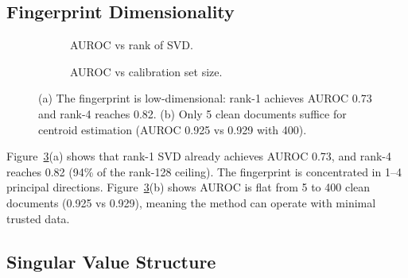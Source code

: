 \documentclass[11pt,a4paper]{article}
\begin{document}
\subsection{Fingerprint Dimensionality}

\begin{figure}[t]
\centering
\begin{subfigure}[b]{0.48\textwidth}
\caption{AUROC vs rank of SVD.}
\label{fig:rank}
\end{subfigure}
\hfill
\begin{subfigure}[b]{0.48\textwidth}
\caption{AUROC vs calibration set size.}
\label{fig:ntrain}
\end{subfigure}
\caption{(a) The fingerprint is low-dimensional: rank-1 achieves AUROC 0.73 and rank-4 reaches 0.82. (b) Only 5 clean documents suffice for centroid estimation (AUROC 0.925 vs 0.929 with 400).}
\label{fig:sweeps}
\end{figure}

Figure~\ref{fig:sweeps}(a) shows that rank-1 SVD already achieves AUROC 0.73, and rank-4 reaches 0.82 (94\% of the rank-128 ceiling). The fingerprint is concentrated in 1--4 principal directions. Figure~\ref{fig:sweeps}(b) shows AUROC is flat from 5 to 400 clean documents (0.925 vs 0.929), meaning the method can operate with minimal trusted data.

\subsection{Singular Value Structure}
\end{document}
